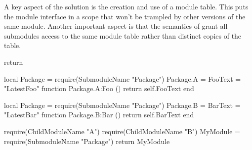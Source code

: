 A key aspect of the solution is the creation and use of a module table. This
puts the module interface in a scope that won't be trampled by other versions
of the same module.  Another important aspect is that the semantics of
 grant all submodules access to the same module table rather
than distinct copies of the table.

\begin{lrbox}{\RightBoxA}
\begin{NestedLuaCode}[linewidth=3.25in]
return {}
\end{NestedLuaCode}
\end{lrbox}

\begin{lrbox}{\RightBoxB}
\begin{NestedLuaCode}[linewidth=3.25in]
local Package = require(SubmoduleName "Package")
Package.A = { FooText = "LatestFoo" }
function Package.A:Foo ()
	return self.FooText
end
\end{NestedLuaCode}
\end{lrbox}

\begin{lrbox}{\RightBoxC}
\begin{NestedLuaCode}[linewidth=3.25in]
local Package = require(SubmoduleName "Package")
Package.B = { BarText = "LatestBar" }
function Package.B:Bar ()
	return self.BarText
end
\end{NestedLuaCode}
\end{lrbox}

\begin{lrbox}{\RightBoxD}
\begin{NestedLuaCode}[linewidth=3.25in]
require(ChildModuleName "A")
require(ChildModuleName "B")
MyModule = require(SubmoduleName "Package")
return MyModule
\end{NestedLuaCode}
\end{lrbox}

\begin{lrbox}{\BoxA}
{\LstSize{}}
\end{lrbox}

\begin{lrbox}{\BoxB}
{\LstSize{}}
\end{lrbox}


